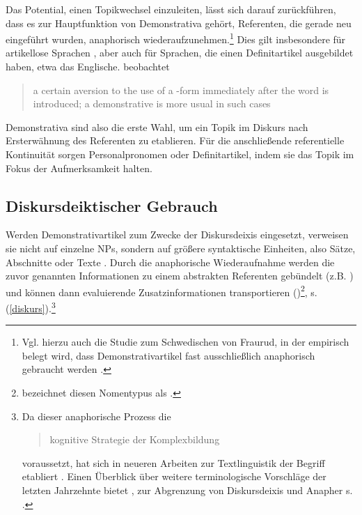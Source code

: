 \begin{exe}
	\ex \label{ex:topic}  
\end{exe}

Das Potential, einen Topikwechsel einzuleiten, lässt sich darauf zurückführen, dass es zur Hauptfunktion von Demonstrativa gehört, Referenten, die gerade neu eingeführt wurden, anaphorisch wiederaufzunehmen.\footnote{Vgl. hierzu auch die Studie zum Schwedischen von Fraurud, in der empirisch belegt wird, dass Demonstrativartikel fast ausschließlich anaphorisch gebraucht werden \parencite[400]{Fraurud1990}.} Dies gilt insbesondere für artikellose Sprachen  \parencite[229]{Himmelmann1996}, aber auch für Sprachen, die einen Definitartikel ausgebildet haben, etwa das Englische. \citeauthor{Christophersen} beobachtet \blockcquote[vgl.][29]{Christophersen1939} {a certain aversion to the use of a -form immediately after the word is introduced; a demonstrative is more usual in such cases}. Demonstrativa sind also die erste Wahl, um ein Topik im Diskurs nach Ersterwähnung des Referenten zu etablieren. Für die  anschließende referentielle Kontinuität sorgen  Personalpronomen oder Definitartikel, indem sie das Topik im Fokus der Aufmerksamkeit halten. 

\subsection{Diskursdeiktischer Gebrauch}\label{diskurs-deikt}

Werden Demonstrativartikel zum Zwecke der Diskursdeixis eingesetzt, verweisen sie nicht auf einzelne NPs, sondern auf größere syntaktische Einheiten, also Sätze, Abschnitte oder Texte \parencite{Webber1991,Fraurud1992, Fillmore1997, Diessel1999, Consten2007, Consten2009, Marx2011}. Durch die anaphorische Wiederaufnahme werden die zuvor genannten Informationen zu einem abstrakten Referenten gebündelt (z.B. ) und können dann evaluierende Zusatzinformationen transportieren ()\footnote{\textcite{Schmid2000} bezeichnet diesen Nomentypus als  .},  s. (\ref{diskurs}).\footnote{Da dieser anaphorische Prozess die \blockcquote[129]{Schwarz2000}{kognitive Strategie der Komplexbildung} voraussetzt, hat sich in neueren Arbeiten zur Textlinguistik der Begriff  etabliert \parencite[s. z.b.][]{Consten2007, Consten2009}. Einen Überblick über weitere terminologische Vorschläge der letzten Jahrzehnte bietet \textcite[16-17]{Marx2011}, zur Abgrenzung von Diskursdeixis und Anapher s. \textcite[30-31]{Consten2004}.} 

